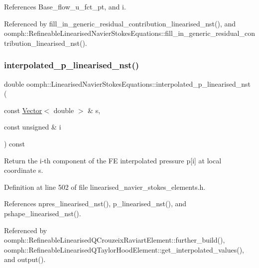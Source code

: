 References Base\+\_\+flow\+\_\+u\+\_\+fct\+\_\+pt, and i.



Referenced by fill\+\_\+in\+\_\+generic\+\_\+residual\+\_\+contribution\+\_\+linearised\+\_\+nst(), and oomph\+::\+Refineable\+Linearised\+Navier\+Stokes\+Equations\+::fill\+\_\+in\+\_\+generic\+\_\+residual\+\_\+contribution\+\_\+linearised\+\_\+nst().

\mbox{\label{classoomph_1_1LinearisedNavierStokesEquations_ab35cfe7f63c8cd7f14217783e95889ee}} 
\subsubsection{\texorpdfstring{interpolated\+\_\+p\+\_\+linearised\+\_\+nst()}{interpolated\_p\_linearised\_nst()}}
{\footnotesize\ttfamily double oomph\+::\+Linearised\+Navier\+Stokes\+Equations\+::interpolated\+\_\+p\+\_\+linearised\+\_\+nst (\begin{DoxyParamCaption}\item[{const \hyperlink{classoomph_1_1Vector}{Vector}$<$ double $>$ \&}]{s,  }\item[{const unsigned \&}]{i }\end{DoxyParamCaption}) const\hspace{0.3cm}{\ttfamily [inline]}}



Return the i-\/th component of the FE interpolated pressure p\mbox{[}i\mbox{]} at local coordinate s. 



Definition at line 502 of file linearised\+\_\+navier\+\_\+stokes\+\_\+elements.\+h.



References npres\+\_\+linearised\+\_\+nst(), p\+\_\+linearised\+\_\+nst(), and pshape\+\_\+linearised\+\_\+nst().



Referenced by oomph\+::\+Refineable\+Linearised\+Q\+Crouzeix\+Raviart\+Element\+::further\+\_\+build(), oomph\+::\+Refineable\+Linearised\+Q\+Taylor\+Hood\+Element\+::get\+\_\+interpolated\+\_\+values(), and output().

